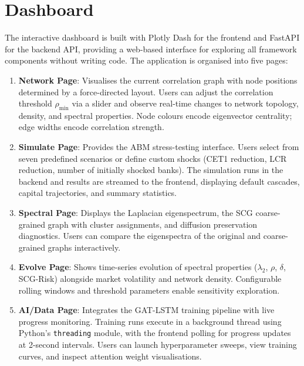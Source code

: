 \section{Dashboard}
\label{sec:dashboard}

The interactive dashboard is built with Plotly Dash for the frontend and FastAPI for the backend API, providing a web-based interface for exploring all framework components without writing code. The application is organised into five pages:

\begin{enumerate}
    \item \textbf{Network Page}: Visualises the current correlation graph with node positions determined by a force-directed layout. Users can adjust the correlation threshold $\rho_{\min}$ via a slider and observe real-time changes to network topology, density, and spectral properties. Node colours encode eigenvector centrality; edge widths encode correlation strength.

    \item \textbf{Simulate Page}: Provides the ABM stress-testing interface. Users select from seven predefined scenarios or define custom shocks (CET1 reduction, LCR reduction, number of initially shocked banks). The simulation runs in the backend and results are streamed to the frontend, displaying default cascades, capital trajectories, and summary statistics.

    \item \textbf{Spectral Page}: Displays the Laplacian eigenspectrum, the SCG coarse-grained graph with cluster assignments, and diffusion preservation diagnostics. Users can compare the eigenspectra of the original and coarse-grained graphs interactively.

    \item \textbf{Evolve Page}: Shows time-series evolution of spectral properties ($\lambda_2$, $\rho$, $\delta$, SCG-Risk) alongside market volatility and network density. Configurable rolling windows and threshold parameters enable sensitivity exploration.

    \item \textbf{AI/Data Page}: Integrates the GAT-LSTM training pipeline with live progress monitoring. Training runs execute in a background thread using Python's \texttt{threading} module, with the frontend polling for progress updates at 2-second intervals. Users can launch hyperparameter sweeps, view training curves, and inspect attention weight visualisations.
\end{enumerate}

